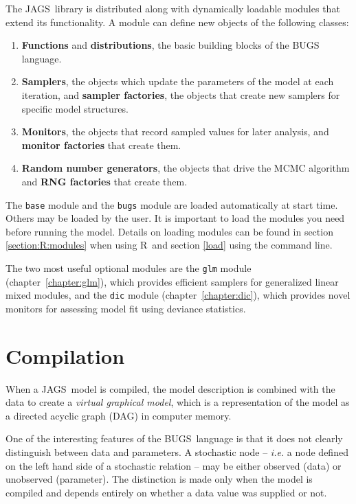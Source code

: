 \documentclass[11pt, a4paper, titlepage]{report}
\newcommand{\JAGS}{\textsf{JAGS}}
\newcommand{\BUGS}{\textsf{BUGS}}
\newcommand{\R}{\textsf{R}}
\begin{document}
The \JAGS\ library is distributed along with dynamically loadable
modules that extend its functionality.  A module can define new
objects of the following classes:
\begin{enumerate}
\item {\bf Functions} and {\bf distributions}, the basic building
blocks of the BUGS language.
\item {\bf Samplers}, the objects which update the parameters of the
model at each iteration, and {\bf sampler factories}, the objects that 
create new samplers for specific model structures.
\item {\bf Monitors}, the objects that record sampled values for
later analysis, and {\bf monitor factories} that create them. 
\item {\bf Random number generators}, the objects that drive the
MCMC algorithm and {\bf RNG factories} that create them.
\end{enumerate}

The \texttt{base} module and the \texttt{bugs} module are loaded
automatically at start time.  Others may be loaded by the user. It is
important to load the modules you need {\rm before} running the model.
Details on loading modules can be found in section \ref{section:R:modules}
when using \R\ and section \ref{load} using the command line.

The two most useful optional modules are the \texttt{glm} module
(chapter~\ref{chapter:glm}), which provides efficient samplers for
generalized linear mixed modules, and the \texttt{dic} module
(chapter~\ref{chapter:dic}), which provides novel monitors for
assessing model fit using deviance statistics.

\section{Compilation}

When a \JAGS\ model is compiled, the model description is combined
with the data to create a {\em virtual graphical model}, which is a
representation of the model as a directed acyclic graph (DAG) in
computer memory.%

One of the interesting features of the \BUGS\ language is that it does
not clearly distinguish between data and parameters.  A stochastic
node -- {\em i.e.} a node defined on the left hand side of a
stochastic relation -- may be either observed (data) or unobserved
(parameter). The distinction is made only when the model is compiled
and depends entirely on whether a data value was supplied or not.
\end{document}
